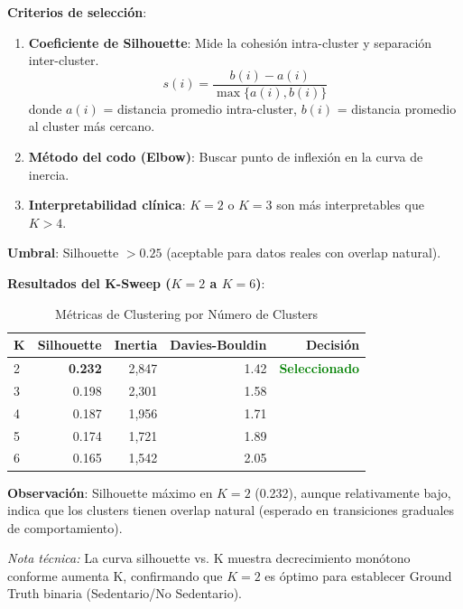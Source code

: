 \documentclass[12pt,letterpaper,twoside]{report}
\begin{document}
\begin{reglabox}
\textbf{Criterios de selección}:

\begin{enumerate}[noitemsep]
    \item \textbf{Coeficiente de Silhouette}: Mide la cohesión intra-cluster y separación inter-cluster.
    \begin{equation}
    s(i) = \frac{b(i) - a(i)}{\max\{a(i), b(i)\}}
    \end{equation}
    donde $a(i)$ = distancia promedio intra-cluster, $b(i)$ = distancia promedio al cluster más cercano.
    
    \item \textbf{Método del codo (Elbow)}: Buscar punto de inflexión en la curva de inercia.
    
    \item \textbf{Interpretabilidad clínica}: $K=2$ o $K=3$ son más interpretables que $K>4$.
\end{enumerate}

\textbf{Umbral}: Silhouette $> 0.25$ (aceptable para datos reales con overlap natural).
\end{reglabox}

\begin{calculobox}
\textbf{Resultados del K-Sweep ($K=2$ a $K=6$)}:

\begin{table}[H]
\centering
\caption{Métricas de Clustering por Número de Clusters}
\label{tab:k_sweep}
\begin{tabular}{@{}lrrrr@{}}
\toprule
\textbf{K} & \textbf{Silhouette} & \textbf{Inertia} & \textbf{Davies-Bouldin} & \textbf{Decisión} \\
\midrule
2 & \textbf{0.232} & 2,847 & 1.42 & \textcolor{green}{\textbf{Seleccionado}} \\
3 & 0.198       & 2,301 & 1.58 & \\
4 & 0.187       & 1,956 & 1.71 & \\
5 & 0.174       & 1,721 & 1.89 & \\
6 & 0.165       & 1,542 & 2.05 & \\
\bottomrule
\end{tabular}
\end{table}

\textbf{Observación}: Silhouette máximo en $K=2$ (0.232), aunque relativamente bajo, indica que los clusters tienen overlap natural (esperado en transiciones graduales de comportamiento).

\textit{Nota técnica:} La curva silhouette vs. K muestra decrecimiento monótono conforme aumenta K, confirmando que $K=2$ es óptimo para establecer Ground Truth binaria (Sedentario/No Sedentario).
\end{calculobox}
\end{document}
